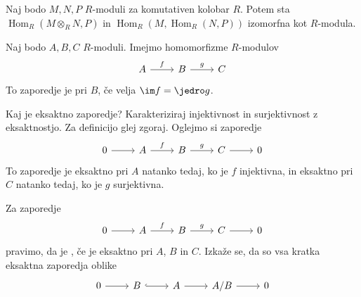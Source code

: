 \begin{izrek}
  Naj bodo $M, N, P$ $R$-moduli za komutativen kolobar $R$.
  Potem sta $\operatorname{Hom}_R(M \otimes_R N, P)$ in $\operatorname{Hom}_R(M,
  \operatorname{Hom}_R(N, P))$ izomorfna kot $R$-modula.
\end{izrek}



\begin{definicija}
  Naj bodo $A, B, C$ $R$-moduli.
  Imejmo homomorfizme $R$-modulov
  \[\begin{tikzcd}
	  A & B & C
	  \arrow["f", from=1-1, to=1-2]
	  \arrow["g", from=1-2, to=1-3]
	\end{tikzcd}\]
  To zaporedje je  pri $B$, če velja $\im f = \jedro g$.
\end{definicija}

\begin{vo}{Kaj je eksaktno zaporedje? Karakteriziraj injektivnost in
	surjektivnost z eksaktnostjo.}
  Za definicijo glej zgoraj.
  Oglejmo si zaporedje
  \[\begin{tikzcd}
	  0 & A & B & C & 0
	  \arrow[from=1-1, to=1-2]
	  \arrow["f", from=1-2, to=1-3]
	  \arrow["g", from=1-3, to=1-4]
	  \arrow[from=1-4, to=1-5]
	\end{tikzcd}\]
  To zaporedje je eksaktno pri $A$ natanko tedaj, ko je $f$ injektivna, in
  eksaktno pri $C$ natanko tedaj, ko je $g$ surjektivna.
\end{vo}

Za zaporedje
\[\begin{tikzcd}
	0 & A & B & C & 0
	\arrow[from=1-1, to=1-2]
	\arrow["f", from=1-2, to=1-3]
	\arrow["g", from=1-3, to=1-4]
	\arrow[from=1-4, to=1-5]
  \end{tikzcd}\]
pravimo, da je , če je eksaktno pri $A$, $B$ in $C$.
Izkaže se, da so vsa kratka eksaktna zaporedja oblike
\[\begin{tikzcd}
	0 & B & A & {A/B} & 0
	\arrow[from=1-1, to=1-2]
	\arrow[hook, from=1-2, to=1-3]
	\arrow[from=1-3, to=1-4]
	\arrow[from=1-4, to=1-5]
  \end{tikzcd}\]


